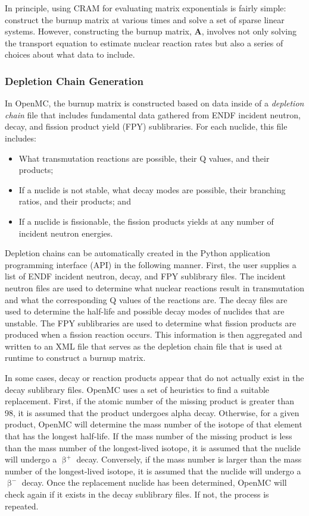\documentclass[3p,authoryear]{elsarticle}
\newcommand{\vect}[1]{\mathbf{#1}} %
\begin{document}
In principle, using CRAM for evaluating matrix exponentials is fairly simple:
construct the burnup matrix at various times and solve a set of sparse linear
systems. However, constructing the burnup matrix, $\vect{A}$, involves not only
solving the transport equation to estimate nuclear reaction rates but also a
series of choices about what data to include.

\subsubsection{Depletion Chain Generation}
\label{sec:depletion-chain}

In OpenMC, the burnup matrix is constructed based on data inside of a
\emph{depletion chain} file that includes fundamental data gathered from ENDF
incident neutron, decay, and fission product yield (FPY) sublibraries. For each
nuclide, this file includes:
\begin{itemize}
  \item What transmutation reactions are possible, their Q values, and their products;
  \item If a nuclide is not stable, what decay modes are possible, their
  branching ratios, and their products; and
  \item If a nuclide is fissionable, the fission products yields at any number
  of incident neutron energies.
\end{itemize}

Depletion chains can be automatically created in the Python application
programming interface (API) in the following manner. First, the user supplies a
list of ENDF incident neutron, decay, and FPY sublibrary files. The incident
neutron files are used to determine what nuclear reactions result in
transmutation and what the corresponding Q values of the reactions are. The
decay files are used to determine the half-life and possible decay modes of
nuclides that are unstable. The FPY sublibraries are used to determine what
fission products are produced when a fission reaction occurs. This information
is then aggregated and written to an XML file that serves as the depletion chain
file that is used at runtime to construct a burnup matrix.

In some cases, decay or reaction products appear that do not actually exist in
the decay sublibrary files. OpenMC uses a set of heuristics to find a suitable
replacement. First, if the atomic number of the missing product is greater than
98, it is assumed that the product undergoes alpha decay. Otherwise, for a given
product, OpenMC will determine the mass number of the isotope of that element
that has the longest half-life. If the mass number of the missing product is
less than the mass number of the longest-lived isotope, it is assumed that the
nuclide will undergo a $\upbeta^+$ decay. Conversely, if the mass number is
larger than the mass number of the longest-lived isotope, it is assumed that the
nuclide will undergo a $\upbeta^-$ decay. Once the replacement nuclide has been
determined, OpenMC will check again if it exists in the decay sublibrary files.
If not, the process is repeated.
\end{document}
